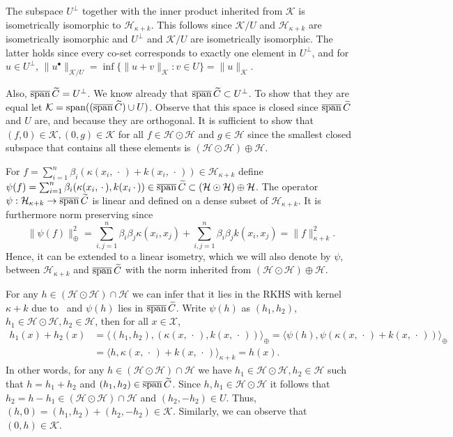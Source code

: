 \documentclass[AHL,Unicode,longabstracts,published]{cedram}
\theoremstyle{remark}
\DeclareMathOperator{\spn}{span}
\DeclareMathOperator{\cspn}{\overline{span}}
\newcommand{\X}{\mathcal{X}}
\newcommand{\cH}{\mathcal{H}}
\newcommand{\clK}{\mathcal{K}}
\let\oldtilde\tilde
\renewcommand*{\tilde}[1]{\mathchoice{\widetilde{#1}}{\widetilde{#1}}{\oldtilde{#1}}{\oldtilde{#1}}}
\renewcommand*{\to}{\mathchoice{\longrightarrow}{\rightarrow}{\rightarrow}{\rightarrow}}
\begin{document}
The subspace $U^\perp$ together with the inner product inherited from $\clK$ is isometrically isomorphic to $\cH_{\kappa + k}$. This follows since $\clK/U$ and $\cH_{\kappa+k}$ are isometrically isomorphic and $U^\perp$ and $\clK/U$ are isometrically isomorphic. The latter holds since every co-set corresponds to exactly one element in $U^\perp$, and for $u \in U^\perp$, $\|u^\bullet\|_{\clK/U} = \inf\{\|u + v\|_\clK :v \in U\}= \|u\|_\clK$.

Also, $\cspn \tilde C = U^\perp$. We know already that $\cspn \tilde C \subset U^\perp$. To show that they are equal let $ \clK = \spn ((\cspn \tilde C) \cup U)$. Observe that this space is closed since $\cspn \tilde C$ and $U$ are, and because they are orthogonal. It is sufficient to show that $(f,0) \in \clK, (0,g) \in \clK$ for all $f \in \cH \odot\cH$ and $g \in \cH$ since the smallest closed subspace that contains all these elements is $(\cH \odot \cH) \oplus \cH$.

For $f = \sum_{i=1}^n \beta_i (\kappa(x_i,\,\cdot\,) + k(x_i,\,\cdot\,))\in \cH_{\kappa +k}$ define $\psi(f) = \sum_{i=1}^n \beta_i (\kappa(x_i,\,\cdot\,),\linebreak k(x_i\,\cdot\,)) \in \cspn \tilde C \subset (\cH \odot \cH) \oplus \cH$. The operator $\psi: \cH_{\kappa +k} \to \cspn \tilde C$ is linear and defined on a dense subset of $\cH_{\kappa + k}$. It is furthermore norm preserving since
\[
\| \psi(f) \|^2_\oplus = \sum_{i,j=1}^n \beta_i \beta_j \kappa(x_i,x_j) + \sum_{i,j=1}^n \beta_i \beta_j k(x_i,x_j) = \|f\|_{\kappa +k}^2.
\]
Hence, it can be extended to a linear isometry, which we will also denote by $\psi$, between $\cH_{\kappa + k}$ and $\cspn \tilde C$ with the norm inherited from $(\cH \odot \cH) \oplus \cH$.

For any $h\in (\cH \odot \cH) \cap \cH$ we can infer that it lies in the RKHS with kernel $\kappa + k$ due to~\cite[Theorem, p.~353]{ARON50} and $\psi(h)$ lies in $\cspn \tilde C$. Write $\psi(h)$ as $(h_1, h_2)$, $h_1 \in \cH \odot \cH, h_2 \in \cH$, then for all $x\in \X$,
\begin{align*}
h_1(x) + h_2(x) &= \bigl\langle (h_1,h_2), (\kappa(x,\,\cdot\,), k(x,\,\cdot\,)) \bigr\rangle_\oplus = \bigl\langle \psi(h), \psi(\kappa(x,\,\cdot\,) + k(x,\,\cdot\,)) \bigr\rangle_\oplus \\
&= \bigl\langle h,\kappa(x,\,\cdot\,) + k(x,\,\cdot\,) \bigr\rangle_{\kappa +k} = h(x).
\end{align*}
In other words, for any $h\in (\cH \odot \cH)\cap \cH$ we have $h_1 \in \cH \odot \cH, h_2 \in \cH$ such that $h= h_1 + h_2$ and $(h_1,h_2) \in \cspn \tilde C$. Since $h,h_1 \in \cH \odot \cH$ it follows that $h_2 = h - h_1 \in (\cH \odot \cH) \cap \cH$ and $(h_2, -h_2) \in U$. Thus, $(h,0) = (h_1,h_2) + (h_2,-h_2) \in \clK$. Similarly, we can observe that $(0,h) \in \clK$.
\end{document}
